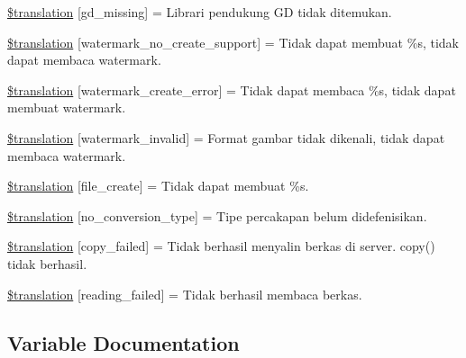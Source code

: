 \begin{DoxyCompactItemize}
\hyperlink{class_8upload_8id___i_d_8php_a7f3dfcc0db4bbc0f2e7210c439798e56}{\$translation} \mbox{[}\textquotesingle{}gd\+\_\+missing\textquotesingle{}\mbox{]} = \textquotesingle{}Librari pendukung G\+D tidak ditemukan.\textquotesingle{}
\item 
\hyperlink{class_8upload_8id___i_d_8php_a82d5853430ab72dc1f9799ec36144cc6}{\$translation} \mbox{[}\textquotesingle{}watermark\+\_\+no\+\_\+create\+\_\+support\textquotesingle{}\mbox{]} = \textquotesingle{}Tidak dapat membuat \%s, tidak dapat membaca watermark.\textquotesingle{}
\item 
\hyperlink{class_8upload_8id___i_d_8php_aabca0b65dadbc6184415c16375f284ca}{\$translation} \mbox{[}\textquotesingle{}watermark\+\_\+create\+\_\+error\textquotesingle{}\mbox{]} = \textquotesingle{}Tidak dapat membaca \%s, tidak dapat membuat watermark.\textquotesingle{}
\item 
\hyperlink{class_8upload_8id___i_d_8php_ac336e7a5701e47ba4a05e9e498a3cc44}{\$translation} \mbox{[}\textquotesingle{}watermark\+\_\+invalid\textquotesingle{}\mbox{]} = \textquotesingle{}Format gambar tidak dikenali, tidak dapat membaca watermark.\textquotesingle{}
\item 
\hyperlink{class_8upload_8id___i_d_8php_a1ecb4673e4fb69e06b3f20b65cecf30a}{\$translation} \mbox{[}\textquotesingle{}file\+\_\+create\textquotesingle{}\mbox{]} = \textquotesingle{}Tidak dapat membuat \%s.\textquotesingle{}
\item 
\hyperlink{class_8upload_8id___i_d_8php_a4712d7ec28e9a7f17eb3338af2358363}{\$translation} \mbox{[}\textquotesingle{}no\+\_\+conversion\+\_\+type\textquotesingle{}\mbox{]} = \textquotesingle{}Tipe percakapan belum didefenisikan.\textquotesingle{}
\item 
\hyperlink{class_8upload_8id___i_d_8php_a783c9358bcf54a054545b50098bc679b}{\$translation} \mbox{[}\textquotesingle{}copy\+\_\+failed\textquotesingle{}\mbox{]} = \textquotesingle{}Tidak berhasil menyalin berkas di server. copy() tidak berhasil.\textquotesingle{}
\item 
\hyperlink{class_8upload_8id___i_d_8php_a01bea14c9fd5f353f62db44beabfcd42}{\$translation} \mbox{[}\textquotesingle{}reading\+\_\+failed\textquotesingle{}\mbox{]} = \textquotesingle{}Tidak berhasil membaca berkas.\textquotesingle{}
\end{DoxyCompactItemize}


\subsection{Variable Documentation}
\hypertarget{class_8upload_8id___i_d_8php_a1f198d410fecc3871ebdd468d343a5e3}{}
